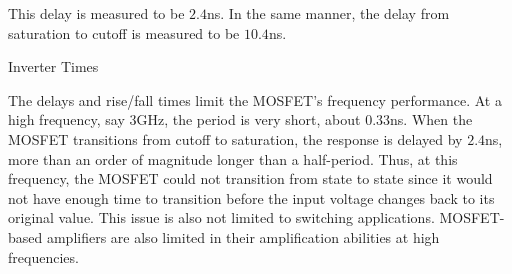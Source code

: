 This delay is measured to be $2.4$\si{\nano\second}. In the same manner, the delay from saturation to cutoff is measured to be $10.4$\si{\nano\second}.

\FloatBarrier
\begin{table}[h!]
	\centering
	\caption{Inverter Times}
	\label{tab:inverter_times}
\end{table}
\FloatBarrier

The delays and rise/fall times limit the MOSFET's frequency performance. At a high frequency, say $3$\si{\giga\hertz}, the period is very short, about $0.33$\si{\nano\second}. When the MOSFET transitions from cutoff to saturation, the response is delayed by $2.4$\si{\nano\second}, more than an order of magnitude longer than a half-period. Thus, at this frequency, the MOSFET could not transition from state to state since it would not have enough time to transition before the input voltage changes back to its original value. This issue is also not limited to switching applications. MOSFET-based amplifiers are also limited in their amplification abilities at high frequencies.

